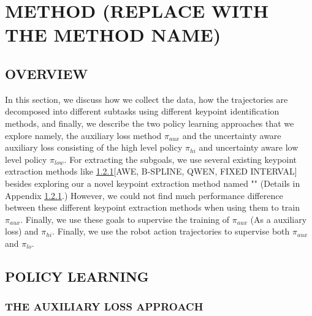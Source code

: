 \documentclass[letterpaper, 10 pt, conference]{ieeeconf}  %
\newcommand{\dave}[1]{\textcolor{blue}{Dave: [#1]}} %
\begin{document}
\section{METHOD (REPLACE WITH THE METHOD NAME) }

\subsection{OVERVIEW}

In this section, we discuss how we collect the data, how the trajectories are decomposed into different subtasks using different keypoint identification methods, and finally, we describe the two policy learning approaches that we explore namely, the auxiliary loss method \(\pi_{aux}\) and the uncertainty aware auxiliary loss consisting of the high level policy \(\pi_{hi}\) and uncertainty aware low level policy \(\pi_{low}\). For extracting the subgoals, we use several existing keypoint extraction methods like \ref{}[AWE, B-SPLINE, QWEN, FIXED INTERVAL] besides exploring our a novel keypoint extraction method named "" (Details in Appendix \ref{}.) However, we could not find much performance difference between these different keypoint extraction methods when using them to train \(\pi_{aux}\). Finally, we use these goals to supervise the training of \(\pi_{aux}\) (As a auxiliary loss) and \(\pi_{hi}\). Finally, we use the robot action trajectories to supervise both \(\pi_{aux}\) and \(\pi_{lo}\).





\subsection{POLICY LEARNING}


\subsubsection{THE AUXILIARY LOSS APPROACH}
\end{document}
